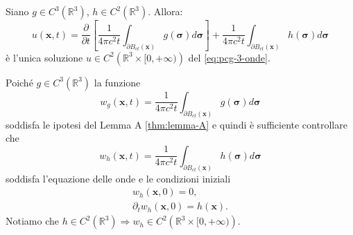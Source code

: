 \documentclass[10pt,a4paper,twoside,openright]{book}
\newcommand{\x}{\mathbf{x}}
\begin{document}
\begin{theorem}
	 Siano $\displaystyle g\in C^{3}\left(\mathbb{R}^{3}\right)$, $\displaystyle h\in C^{2}\left(\mathbb{R}^{3}\right)$. Allora:
	\begin{equation}
		u(\x ,t) =\frac{\partial }{\partial t}\left[\frac{1}{4\pi c^{2} t}\int _{\partial B_{ct}(\x)} g(\bm{\sigma }) d\bm{\sigma }\right] +\frac{1}{4\pi c^{2} t}\int _{\partial B_{ct}(\x)} h(\bm{\sigma }) d\bm{\sigma }
	\end{equation}
	è l'unica soluzione $\displaystyle u\in C^{2}\left(\mathbb{R}^{3} \times [ 0,+\infty )\right)$ del \eqref{eq:pcg-3-onde}.
\end{theorem}
\begin{dimostrazione}
	Poiché $\displaystyle g\in C^{3}\left(\mathbb{R}^{3}\right)$ la funzione
	\begin{equation*}
		w_{g}(\x ,t) =\frac{1}{4\pi c^{2} t}\int _{\partial B_{ct}(\x)} g(\bm{\sigma }) d\bm{\sigma }
	\end{equation*}
	soddisfa le ipotesi del Lemma A \ref{thm:lemma-A} e quindi è sufficiente controllare che
	\begin{equation*}
		w_{h}(\x ,t) =\frac{1}{4\pi c^{2} t}\int _{\partial B_{ct}(\x)} h(\bm{\sigma }) d\bm{\sigma }
	\end{equation*}
	soddisfa l'equazione delle onde e le condizioni iniziali
	\begin{gather*}
		w_{h}(\x ,0) =0,\\
		\partial _{t} w_{h}(\x ,0) =h(\x) .
	\end{gather*}
	Notiamo che $\displaystyle h\in C^{2}\left(\mathbb{R}^{3}\right) \Rightarrow w_{h} \in C^{2}\left(\mathbb{R}^{3} \times [ 0,+\infty )\right)$.


\end{dimostrazione}
\end{document}
